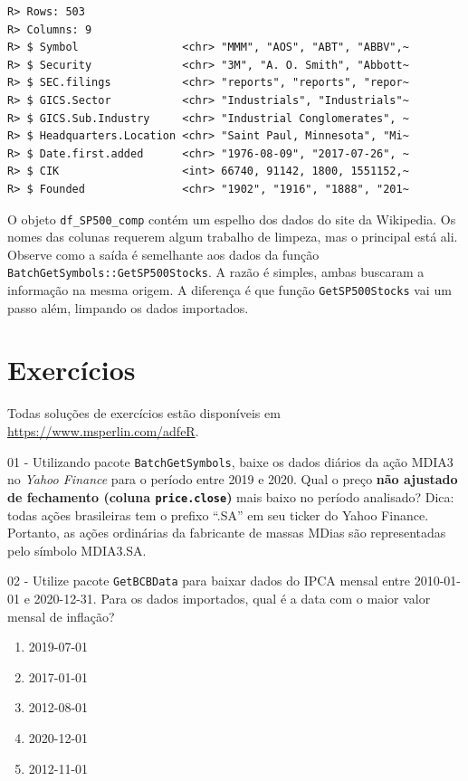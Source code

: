 \documentclass[
  11pt,
]{book}
\providecommand{\tightlist}{%
  \setlength{\itemsep}{0pt}\setlength{\parskip}{0pt}}
\begin{document}
\begin{verbatim}
R> Rows: 503
R> Columns: 9
R> $ Symbol                <chr> "MMM", "AOS", "ABT", "ABBV",~
R> $ Security              <chr> "3M", "A. O. Smith", "Abbott~
R> $ SEC.filings           <chr> "reports", "reports", "repor~
R> $ GICS.Sector           <chr> "Industrials", "Industrials"~
R> $ GICS.Sub.Industry     <chr> "Industrial Conglomerates", ~
R> $ Headquarters.Location <chr> "Saint Paul, Minnesota", "Mi~
R> $ Date.first.added      <chr> "1976-08-09", "2017-07-26", ~
R> $ CIK                   <int> 66740, 91142, 1800, 1551152,~
R> $ Founded               <chr> "1902", "1916", "1888", "201~
\end{verbatim}

O objeto \texttt{df\_SP500\_comp} contém um espelho dos dados do site da Wikipedia. Os nomes das colunas requerem algum trabalho de limpeza, mas o principal está ali. Observe como a saída é semelhante aos dados da função \texttt{BatchGetSymbols::GetSP500Stocks}. A razão é simples, ambas buscaram a informação na mesma origem. A diferença é que função \texttt{GetSP500Stocks} vai um passo além, limpando os dados importados.

\hypertarget{exerc-importacao-pacotes}{%
\section{Exercícios}\label{exerc-importacao-pacotes}}

Todas soluções de exercícios estão disponíveis em \url{https://www.msperlin.com/adfeR}.

01 -
Utilizando pacote \texttt{BatchGetSymbols}, baixe os dados diários da ação MDIA3 no \emph{Yahoo Finance} para o período entre 2019 e 2020. Qual o preço \textbf{não ajustado de fechamento (coluna \texttt{price.close})} mais baixo no período analisado? Dica: todas ações brasileiras tem o prefixo ``.SA'' em seu ticker do Yahoo Finance. Portanto, as ações ordinárias da fabricante de massas MDias são representadas pelo símbolo MDIA3.SA.

02 -
Utilize pacote \texttt{GetBCBData} para baixar dados do IPCA mensal entre 2010-01-01 e 2020-12-31. Para os dados importados, qual é a data com o maior valor mensal de inflação?

\begin{enumerate}
\def\labelenumi{\alph{enumi})}
\tightlist
\item
  2019-07-01
\item
  2017-01-01
\item
  2012-08-01
\item
  2020-12-01
\item
  2012-11-01
\end{enumerate}
\end{document}
